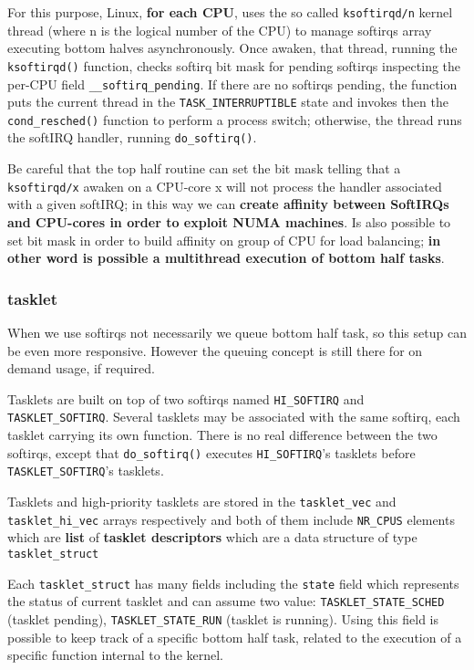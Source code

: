 \documentclass[10pt,a4paper]{article}
\begin{document}
For this purpose, Linux, \textbf{for each CPU}, uses the so called \texttt{ksoftirqd/n} kernel thread (where n is the logical number of the CPU) to manage softirqs array executing bottom halves asynchronously. Once awaken, that thread, running the \texttt{ksoftirqd()} function, checks softirq bit mask for pending softirqs inspecting the per-CPU field \texttt{\_\_softirq\_pending}. If there are no softirqs pending, the function puts the current thread in the \texttt{TASK\_INTERRUPTIBLE} state and invokes then the \texttt{cond\_resched()} function to perform a process switch; otherwise, the thread runs the softIRQ handler, running \texttt{do\_softirq()}.

Be careful that the top half routine can set the bit mask telling that a \texttt{ksoftirqd/x} awaken on a CPU-core x will not process the handler associated with a given softIRQ; in this way we can \textbf{create affinity between SoftIRQs and CPU-cores in order to exploit NUMA machines}. Is also possible to set bit mask  in order to build affinity on group of CPU for load balancing; \textbf{in other word is possible a multithread execution of bottom half tasks}.

\subsubsection{tasklet}

When we use softirqs not necessarily we queue bottom half task, so this setup can be even more responsive. However the queuing concept is still there for on demand usage, if required. 

Tasklets are built on top of two softirqs named \texttt{HI\_SOFTIRQ} and \texttt{TASKLET\_SOFTIRQ}. Several tasklets may be associated with the same softirq, each tasklet carrying its own function. There is no real difference between the two softirqs, except that \texttt{do\_softirq()} executes \texttt{HI\_SOFTIRQ}’s tasklets before \texttt{TASKLET\_SOFTIRQ}’s tasklets.

Tasklets and high-priority tasklets are stored in the \texttt{tasklet\_vec} and \texttt{tasklet\_hi\_vec}
arrays respectively and both of them include \texttt{NR\_CPUS} elements which are \textbf{list} of \textbf{tasklet descriptors} which are a data structure of type \texttt{tasklet\_struct}

Each \texttt{tasklet\_struct} has many fields including the \texttt{state} field which represents the status of current tasklet and can assume two value: \texttt{TASKLET\_STATE\_SCHED} (tasklet pending), \texttt{TASKLET\_STATE\_RUN} (tasklet is running). Using this field is possible to keep track of a specific bottom half task, related to the execution of a specific function internal to the kernel.
\end{document}
